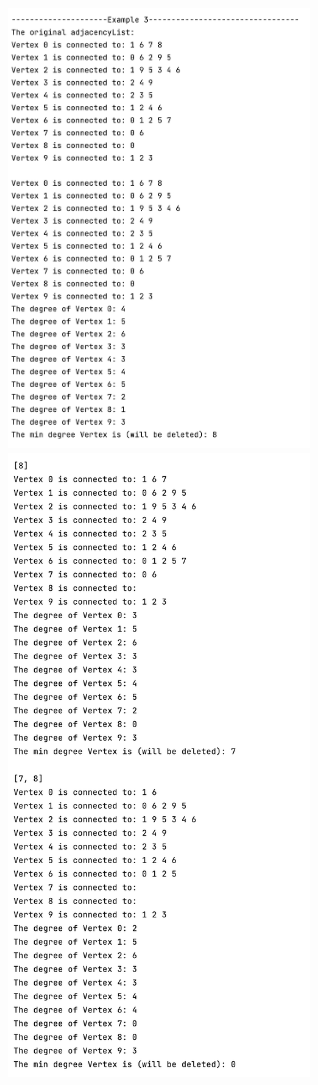 \documentclass{article}
\begin{document}
\begin{enumerate}
\begin{center}
        \includegraphics[width=0.6\textwidth]{p27.png}
        \includegraphics[width=0.6\textwidth]{p28.png}

\end{center}
\end{enumerate}
\end{document}
